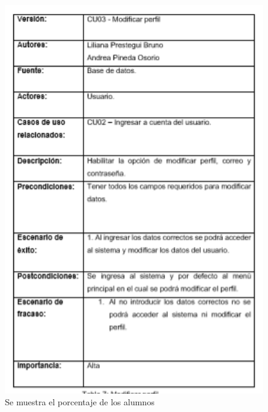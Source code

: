 \documentclass[letterpaper,oneside,openany,11pt]{book}
\begin{document}
\begin{figure}[H]
	\centering
	\includegraphics[width=1.0\textwidth]{./Imagenes/15}
	\caption{Se muestra el porcentaje de los alumnos}
\end{figure}
\end{document}
